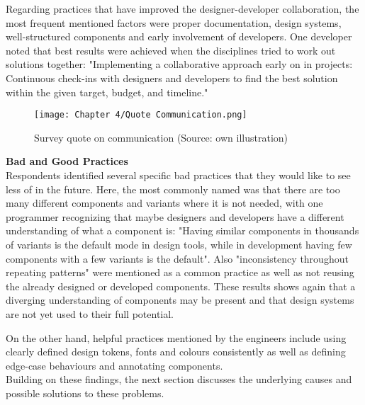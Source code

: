 Regarding practices that have improved the designer-developer collaboration, the most frequent
mentioned factors were proper documentation, design systems, well-structured components and early
involvement of developers. One developer noted that best results were achieved when the disciplines
tried to work out solutions together:
"Implementing a collaborative approach early on in projects: Continuous check-ins with designers and
developers to find the best solution within the given target, budget, and timeline."

\begin{figure}[H]
    \centering
    \texttt{[image: Chapter 4/Quote Communication.png]}
    \caption{Survey quote on communication (Source: own illustration)}
\end{figure}

\textbf{Bad and Good Practices}\\
Respondents identified several specific bad practices that they would like to see less of in the
future. Here, the most commonly named was that there are too many different components and variants
where it is not needed, with one programmer recognizing that maybe designers and developers have a
different understanding of what a component is: "Having similar components in thousands of variants
is the default mode in design tools, while in development having few components with a few variants
is the default". Also "inconsistency throughout repeating patterns" were mentioned as a common
practice as well as not reusing the already designed or developed components. These results shows
again that a diverging understanding of components may be present and that design systems are not
yet used to their full potential.

On the other hand, helpful practices mentioned by the engineers include using clearly defined design
tokens, fonts and colours consistently as well as defining edge-case behaviours and annotating
components. \\

Building on these findings, the next section discusses the underlying causes and possible solutions
to these problems.


